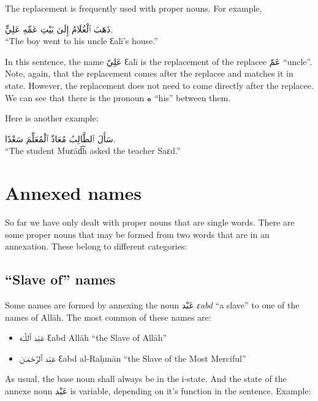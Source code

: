 \documentclass[
  10pt,
]{book}
\providecommand{\tightlist}{%
  \setlength{\itemsep}{0pt}\setlength{\parskip}{0pt}}
\begin{document}
The replacement is frequently used with proper nouns. For example,

\foreignlanguage{arabic}{ذَهَبَ ٱلْغُلَامُ إِلَىٰ بَيْتِ عَمِّهِ عَلِيٍّ.}\\
\enquote{The boy went to his uncle Ɛalī's house.}

In this sentence, the name \foreignlanguage{arabic}{عَلِيّ} Ɛalī is the replacement of the replacee \foreignlanguage{arabic}{عَمّ} \enquote{uncle}. Note, again, that the replacement comes after the replacee and matches it in state. However, the replacement does not need to come directly after the replacee. We can see that there is the pronoun \foreignlanguage{arabic}{ه} \enquote{his} between them.

Here is another example:

\foreignlanguage{arabic}{سَأَلَ ٱلطَّالِبُ مُعَاذٌ ٱلْمُعَلِّمَ سَعْدًا.}\\
\enquote{The student Muɛād͡h asked the teacher Saɛd.}

\section{Annexed names}\label{annexed-names}

So far we have only dealt with proper nouns that are single words. There are some proper nouns that may be formed from two words that are in an annexation. These belong to different categories:

\subsection{\texorpdfstring{\enquote{Slave of} names}{``Slave of'' names}}\label{slave-of-names}

Some names are formed by annexing the noun \foreignlanguage{arabic}{عَبْد} \emph{ɛabd} \enquote{a slave} to one of the names of Allāh. The most common of these names are:

\begin{itemize}
\tightlist
\item
  \foreignlanguage{arabic}{عَبْد ٱللَّـٰه} Ɛabd Allāh \enquote{the Slave of Allāh}
\item
  \foreignlanguage{arabic}{عَبْد ٱلرَّحْمَـٰن} Ɛabd al-Raḥmān \enquote{the Slave of the Most Merciful}
\end{itemize}

As usual, the base noun shall always be in the i-state. And the state of the annexe noun \foreignlanguage{arabic}{عَبْد} is variable, depending on it's function in the sentence. Example:
\end{document}
